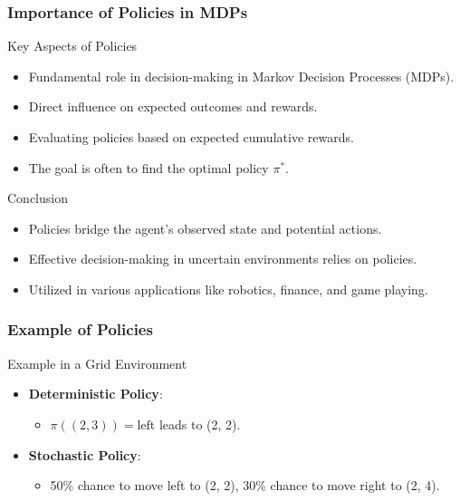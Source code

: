 \documentclass[aspectratio=169]{beamer}
\begin{document}
\begin{frame}[fragile]
    \frametitle{Importance of Policies in MDPs}
    \begin{block}{Key Aspects of Policies}
        \begin{itemize}
            \item Fundamental role in decision-making in Markov Decision Processes (MDPs).
            \item Direct influence on expected outcomes and rewards.
            \item Evaluating policies based on expected cumulative rewards.
            \item The goal is often to find the optimal policy $\pi^*$.
        \end{itemize}
    \end{block}

    \begin{block}{Conclusion}
        \begin{itemize}
            \item Policies bridge the agent's observed state and potential actions.
            \item Effective decision-making in uncertain environments relies on policies.
            \item Utilized in various applications like robotics, finance, and game playing.
        \end{itemize}
    \end{block}
\end{frame}

\begin{frame}[fragile]
    \frametitle{Example of Policies}
    \begin{block}{Example in a Grid Environment}
        \begin{itemize}
            \item \textbf{Deterministic Policy}: 
            \begin{itemize}
                \item $\pi((2, 3)) = \text{left}$ leads to (2, 2).
            \end{itemize}
            \item \textbf{Stochastic Policy}: 
            \begin{itemize}
                \item 50\% chance to move left to (2, 2), 30\% chance to move right to (2, 4).
            \end{itemize}
        \end{itemize}
    \end{block}
\end{frame}
\end{document}
